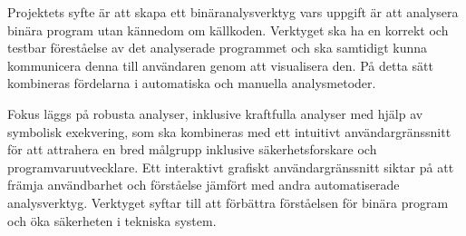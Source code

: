 Projektets syfte är att skapa ett binäranalysverktyg vars uppgift är att analysera binära program
utan kännedom om källkoden. Verktyget ska ha en korrekt och testbar föreståelse av det analyserade
programmet och ska samtidigt kunna kommunicera denna till användaren genom att visualisera den. På
detta sätt kombineras fördelarna i automatiska och manuella analysmetoder.

Fokus läggs på robusta analyser, inklusive kraftfulla analyser med hjälp av symbolisk exekvering,
som ska kombineras med ett intuitivt användargränssnitt för att attrahera en bred målgrupp inklusive
säkerhetsforskare och programvaruutvecklare. Ett interaktivt grafiskt användargränssnitt siktar på
att främja användbarhet och förståelse jämfört med andra automatiserade analysverktyg. Verktyget
syftar till att förbättra förståelsen för binära program och öka säkerheten i tekniska system.
